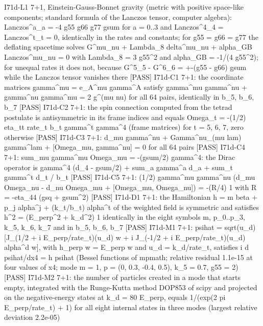 \documentclass[
  10pt,
]{article}
\newenvironment{Shaded}{}{}
\newcommand{\NormalTok}[1]{#1}
\begin{document}
\begin{Shaded}
\begin{Highlighting}[]
\NormalTok{[PASS] I71d{-}L1  7+1, Einstein{-}Gauss{-}Bonnet gravity (metric with positive space{-}like components; standard formula of the Lanczos tensor, computer algebra): Lanczos\^{}a\_a = {-}4 g55 g66 g77 gsum for a = 0..3 and Lanczos\^{}4\_4 = Lanczos\^{}t\_t = 0, identically in the rates and constants; for g55 = g66 = g77 the deflating spacetime solves G\^{}mu\_nu + Lambda\_8 delta\^{}mu\_nu + alpha\_GB Lanczos\^{}mu\_nu = 0 with Lambda\_8 = 3 g55\^{}2 and alpha\_GB = {-}1/(4 g55\^{}2); for unequal rates it does not, because G\^{}5\_5 {-} G\^{}6\_6 = +{-}(g55 {-} g66) gsum while the Lanczos tensor vanishes there}
\NormalTok{[PASS] I71d{-}C1  7+1: the coordinate matrices gamma\^{}mu = e\_A\^{}mu gamma\^{}A satisfy gamma\^{}mu gamma\^{}nu + gamma\^{}nu gamma\^{}mu = 2 g\^{}(mu nu) for all 64 pairs, identically in b\_5, b\_6, b\_7}
\NormalTok{[PASS] I71d{-}C2  7+1: the spin connection computed from the tetrad postulate is antisymmetric in its frame indices and equals Omega\_t = {-}(1/2) eta\_tt rate\_t b\_t gamma\^{}t gamma\^{}4 (frame matrices) for t = 5, 6, 7, zero otherwise}
\NormalTok{[PASS] I71d{-}C3  7+1: d\_mu gamma\^{}nu + Gamma\^{}nu\_(mu lam) gamma\^{}lam + [Omega\_mu, gamma\^{}nu] = 0 for all 64 pairs}
\NormalTok{[PASS] I71d{-}C4  7+1: sum\_mu gamma\^{}mu Omega\_mu = {-}(gsum/2) gamma\^{}4: the Dirac operator is gamma\^{}4 (d\_4 {-} gsum/2) + sum\_a gamma\^{}a d\_a + sum\_t gamma\^{}t d\_t / b\_t}
\NormalTok{[PASS] I71d{-}C5  7+1: (1/2) gamma\^{}mu gamma\^{}nu (d\_mu Omega\_nu {-} d\_nu Omega\_mu + [Omega\_mu, Omega\_nu]) = {-}(R/4) 1 with R = {-}eta\_44 (gsq + gsum\^{}2)}
\NormalTok{[PASS] I71d{-}D1  7+1: the Hamiltonian h = m beta + p\_j alpha\^{}j + (k\_t/b\_t) alpha\^{}t of the weighted field is symmetric and satisfies h\^{}2 = (E\_perp\^{}2 + k\_d\^{}2) 1 identically in the eight symbols m, p\_0..p\_3, k\_5, k\_6, k\_7 and in b\_5, b\_6, b\_7}
\NormalTok{[PASS] I71d{-}M1  7+1: psihat = sqrt(u\_d) [J\_(1/2 + i E\_perp/rate\_t)(u\_d) w + i J\_({-}1/2 + i E\_perp/rate\_t)(u\_d) alpha\^{}d w], with h\_perp w = E\_perp w and u\_d = k\_d/rate\_t, satisfies i d psihat/dx4 = h psihat (Bessel functions of mpmath; relative residual 1.1e{-}15 at four values of x4; mode m = 1, p = (0, 0.3, {-}0.4, 0.5), k\_5 = 0.7, g55 = 2)}
\NormalTok{[PASS] I71d{-}M2  7+1: the number of particles created in a mode that starts empty, integrated with the Runge{-}Kutta method DOP853 of scipy and projected on the negative{-}energy states at k\_d = 80 E\_perp, equals 1/(exp(2 pi E\_perp/rate\_t) + 1) for all eight internal states in three modes (largest relative deviation 2.2e{-}05)}

\end{Highlighting}
\end{Shaded}
\end{document}
